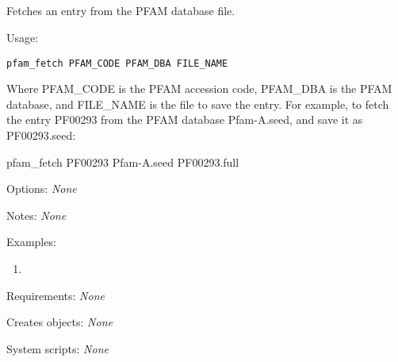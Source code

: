 
\subsection[pfam\_fetch]{  }



Fetches an entry from the PFAM database file.


\begin{description}


\item{Usage:}

{\tt pfam\_fetch PFAM\_CODE PFAM\_DBA FILE\_NAME}

 Where PFAM\_CODE is the PFAM accession code, PFAM\_DBA is
 the PFAM database, and FILE\_NAME is the file to save
 the entry. For example, to fetch the entry PF00293
 from the PFAM database Pfam-A.seed, and save it as
 PF00293.seed:

 pfam\_fetch PF00293 Pfam-A.seed PF00293.full


\item{Options:} {\em None}


\item{Notes:} {\em None}


\item{Examples:}
\begin{enumerate}

\item
\begin{verbatim}
\end{verbatim}

\end{enumerate}


\item{Requirements:} {\em None}


\item{Creates objects:} {\em None}


\item{System scripts:} {\em None}

\end{description}

